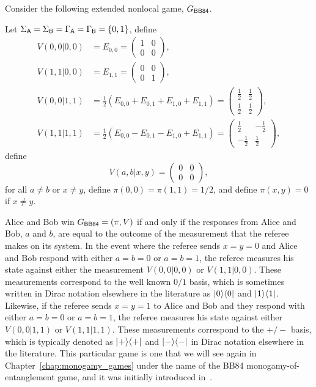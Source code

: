 Consider the following extended nonlocal game, $G_{\BB84}$.
\begin{example}\label{ex:bb84-monogamy-game}
	Let $\Sigma_{\mathsf{A}} = \Sigma_{\mathsf{B}} = \Gamma_{\mathsf{A}} = \Gamma_{\mathsf{B}} = \{0,1\}$, define 
	\begin{equation} 
	\begin{aligned}
		V(0,0|0,0) &= E_{0,0} = \begin{pmatrix} 1 & 0 \\ 0 & 0 \end{pmatrix}, \\
		V(1,1|0,0) &= E_{1,1} = \begin{pmatrix} 0 & 0 \\ 0 & 1 \end{pmatrix}, \\
		V(0,0|1,1) &= \frac{1}{2}\left( E_{0,0} + E_{0,1} + E_{1,0} + E_{1,1} \right) = \begin{pmatrix} \frac{1}{2} & \frac{1}{2} \\ \frac{1}{2} & \frac{1}{2} \end{pmatrix} , \\
		V(1,1|1,1) &= \frac{1}{2}\left( E_{0,0} - E_{0,1} - E_{1,0} + E_{1,1} \right) = \begin{pmatrix} \frac{1}{2} & -\frac{1}{2} \\ -\frac{1}{2} & \frac{1}{2} \end{pmatrix}, 
	\end{aligned}
	\end{equation}
	define
	\begin{equation}
		V(a,b|x,y) = \begin{pmatrix} 0 & 0 \\ 0 & 0 \end{pmatrix},	
	\end{equation}		
 	for all $a \not= b$ or $x \not= y$, define $\pi(0,0) = \pi(1,1) = 1/2$, and define $\pi(x,y) = 0$ if $x \not= y$. 
\end{example}
Alice and Bob win $G_{\BB84} = (\pi,V)$ if and only if the responses from Alice and Bob, $a$ and $b$, are equal to the outcome of the measurement that the referee makes on its system. In the event where the referee sends $x = y = 0$ and Alice and Bob respond with either $a = b = 0$ or $a = b = 1$, the referee measures his state against either the measurement $V(0,0|0,0)$ or $V(1,1|0,0)$. These measurements correspond to the well known $0/1$ basis, which is sometimes written in Dirac notation elsewhere in the literature as $\lvert\mspace{0.5mu} 0 \mspace{0.5mu} \rangle\langle\mspace{0.5mu} 0 \mspace{0.5mu} \rvert$ and $\lvert\mspace{0.5mu} 1 \mspace{0.5mu} \rangle\langle\mspace{0.5mu} 1 \mspace{0.5mu} \rvert$. Likewise, if the referee sends $x = y = 1$ to Alice and Bob and they respond with either $a = b = 0$ or $a = b = 1$, the referee measures his state against either $V(0,0|1,1)$ or $V(1,1|1,1)$. These measurements correspond to the $+/-$ basis, which is typically denoted as $\lvert\mspace{0.5mu} + \mspace{0.5mu} \rangle\langle\mspace{0.5mu} + \mspace{0.5mu} \rvert$ and $\lvert\mspace{0.5mu} - \mspace{0.5mu} \rangle\langle\mspace{0.5mu} - \mspace{0.5mu} \rvert$ in Dirac notation elsewhere in the literature. This particular game is one that we will see again in Chapter~\ref{chap:monogamy_games} under the name of the BB84 monogamy-of-entanglement game, and it was initially introduced in~\cite{Tomamichel2013}.

